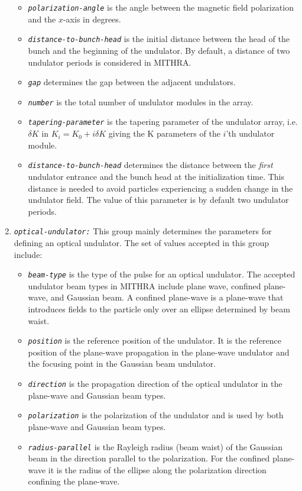 \begin{enumerate}
\begin{itemize}
	\item {\tt \small \em polarization-angle} is the angle between the magnetic field polarization and the $x$-axis in degrees.
	\item {\tt \small \em distance-to-bunch-head} is the initial distance between the head of the bunch and the beginning of the undulator. By default, a distance of two undulator periods is considered in MITHRA.
	\item {\tt \small \em gap} determines the gap between the adjacent undulators.
    \item {\tt \small \em number} is the total number of undulator modules in the array.
    \item {\tt \small \em tapering-parameter} is the tapering parameter of the undulator array, i.e. $\delta K$ in $K_i=K_0+i \delta K$ giving the K parameters of the $i$'th undulator module.
    \item {\tt \small \em distance-to-bunch-head} determines the distance between the {\em first} undulator entrance and the bunch head at the initialization time. This distance is needed to avoid particles experiencing a sudden change in the undulator field. The value of this parameter is by default two undulator periods.
\end{itemize}
%
\item {\tt \small \em optical-undulator:} This group mainly determines the parameters for defining an optical undulator. The set of values accepted in this group include:
%
\begin{itemize}
	\item {\tt \small \em beam-type} is the type of the pulse for an optical undulator. The accepted undulator beam types in MITHRA include plane wave, confined plane-wave, and Gaussian beam. A confined plane-wave is a plane-wave that introduces fields to the particle only over an ellipse determined by beam waist.
	\item {\tt \small \em position} is the reference position of the undulator. It is the reference position of the plane-wave propagation in the plane-wave undulator and the focusing point in the Gaussian beam undulator.
	\item {\tt \small \em direction} is the propagation direction of the optical undulator in the plane-wave and Gaussian beam types.
	\item {\tt \small \em polarization} is the polarization of the undulator and is used by both plane-wave and Gaussian beam types.
	\item {\tt \small \em radius-parallel} is the Rayleigh radius (beam waist) of the Gaussian beam in the direction parallel to the polarization. For the confined plane-wave it is the radius of the ellipse along the polarization direction confining the plane-wave.

\end{itemize}
\end{enumerate}
